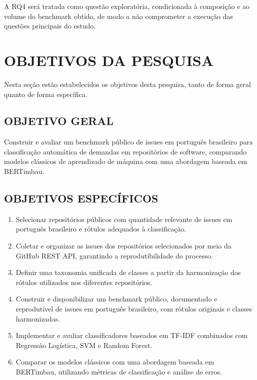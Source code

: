 \documentclass[
    12pt,				       %
    openright,			       %
    oneside,			       %
    a4paper,			       %
    chapter=TITLE,             %
    sumario=tradicional,       %
    english,			        %
    brazil, 				    %
 ]{abntex2}
\begin{document}
A RQ4 será tratada como questão exploratória, condicionada à composição e ao volume do benchmark obtido, de modo a não comprometer a execução das questões principais do estudo.

\chapter{OBJETIVOS DA PESQUISA}\label{sec:objetivos}
Nesta seção estão estabelecidos os objetivos desta pesquisa, tanto de forma geral quanto de forma específica.

\section{OBJETIVO GERAL}\label{sec:ObjGeral}

Construir e avaliar um benchmark público de issues em português brasileiro para classificação automática de demandas em repositórios de software, comparando modelos clássicos de aprendizado de máquina com uma abordagem baseada em BERTimbau.

\section{OBJETIVOS ESPECÍFICOS}\label{sec:ObjEspec}

\begin{enumerate}
    \item Selecionar repositórios públicos com quantidade relevante de issues em português brasileiro e rótulos adequados à classificação.
    \item Coletar e organizar as issues dos repositórios selecionados por meio da GitHub REST API, garantindo a reprodutibilidade do processo.
    \item Definir uma taxonomia unificada de classes a partir da harmonização dos rótulos utilizados nos diferentes repositórios.
    \item Construir e disponibilizar um benchmark público, documentado e reprodutível de issues em português brasileiro, com rótulos originais e classes harmonizadas.
    \item Implementar e avaliar classificadores baseados em TF-IDF combinados com Regressão Logística, SVM e Random Forest.
    \item Comparar os modelos clássicos com uma abordagem baseada em BERTimbau, utilizando métricas de classificação e análise de erros.
\end{enumerate}
\end{document}
